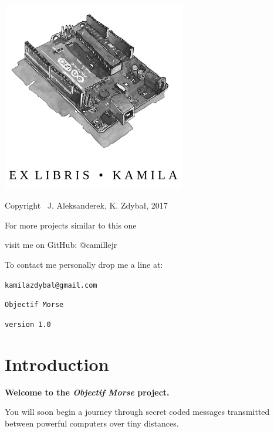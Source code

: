 \documentclass[12pt]{report}
\begin{document}
\thispagestyle{empty}
\begin{center}
    
\vspace*{4cm}

\includegraphics[width = 80mm]{ex_libris_arduino.png}

\vspace*{2cm}

Copyright \textcopyright \, J. Aleksanderek, K. Zdybał, 2017

For more projects similar to this one

visit me on GitHub: @camillejr

To contact me personally drop me a line at:

\verb|kamilazdybal@gmail.com|


\vspace*{2cm}

\verb|Objectif Morse|

\verb|version 1.0|
\end{center}
\newpage




\setlength{\parindent}{0cm}
\clearpage

\tableofcontents

\setlength{\parskip}{1em}
\renewcommand{\baselinestretch}{1.0}

\chapter{Introduction} \label{chap:intro}

\textbf{Welcome to the \textit{Objectif Morse} project.}

You will soon begin a journey through secret coded messages transmitted between powerful computers over tiny distances.
\end{document}

